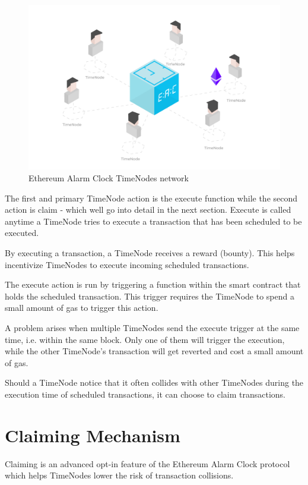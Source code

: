 \documentclass{report}
\begin{document}
  \begin{figure}[h]
    \includegraphics[width=\textwidth]{diagram1}
    \caption{Ethereum Alarm Clock TimeNodes network}
  \end{figure}
    
  The first and primary TimeNode action is the execute function while the second action is claim - which well go into detail in the next section. Execute is called anytime a TimeNode tries to execute a transaction that has been scheduled to be executed.
  
  By executing a transaction, a TimeNode receives a reward (bounty). This helps incentivize TimeNodes to execute incoming scheduled transactions.
   
  The execute action is run by triggering a function within the smart contract that holds the scheduled transaction. This trigger requires the TimeNode to spend a small amount of gas to trigger this action.
   
  A problem arises when multiple TimeNodes send the execute trigger at the same time, i.e. within the same block. Only one of them will trigger the execution, while the other TimeNode’s transaction will get reverted and cost a small amount of gas.
   
  Should a TimeNode notice that it often collides with other TimeNodes during the execution time of scheduled transactions, it can choose to claim transactions.
  
  \section{Claiming Mechanism}
  Claiming is an advanced opt-in feature of the Ethereum Alarm Clock protocol which helps TimeNodes lower the risk of transaction collisions.
\end{document}
